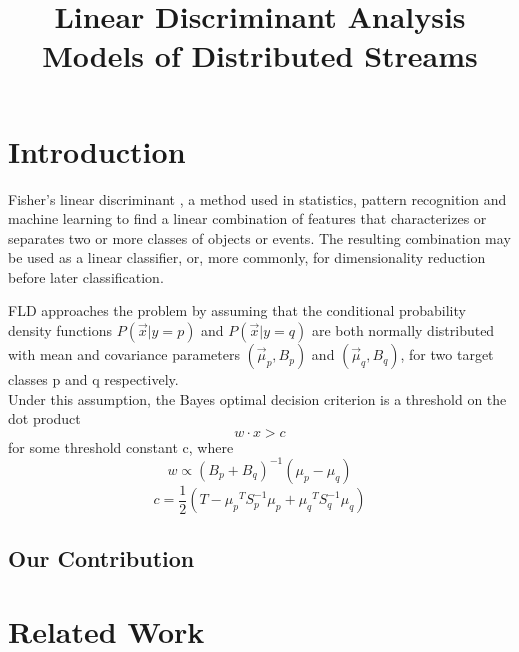 \documentclass[11pt,twocolumn,varwidth=true,a4paper,fleqn]{article}
\begin{document}
\title{Linear Discriminant Analysis Models of Distributed Streams}
\date{}
\maketitle

\begin{abstract}
\end{abstract}

\section{Introduction}
\par Fisher's linear discriminant \cite{fisher1936use}, a method used in statistics, 
pattern recognition and machine learning to find a linear combination of features 
that characterizes or separates two or more classes of objects or events. 
The resulting combination may be used as a linear classifier, or, 
more commonly, for dimensionality reduction before later classification.
\\\par FLD approaches the problem by assuming that the conditional probability density functions $P(\vec x|y=p)$ and $P(\vec x|y=q)$ are both normally distributed with mean and covariance parameters $\left(\vec \mu_p, B_p\right)$ and $\left(\vec \mu_q, B_q\right)$, for two target classes p and q respectively.
\\Under this assumption, the Bayes optimal decision criterion is a threshold on the dot product
\begin{equation*} \label{eq:decision}
w \cdot x > c
\end{equation*}
for some threshold constant c, where
\begin{equation} \label{eq:w}
w \propto (B_p+B_q)^{-1}(\mu_p - \mu_q)
\end{equation}
\begin{equation} \label{eq:c}
c = \frac{1}{2}(T-{\mu_p}^T S_p^{-1} {\mu_p}+{\mu_q}^T S_q^{-1} {\mu_q})
\end{equation}
\subsection{Our Contribution}

\section{Related Work}
\end{document}
